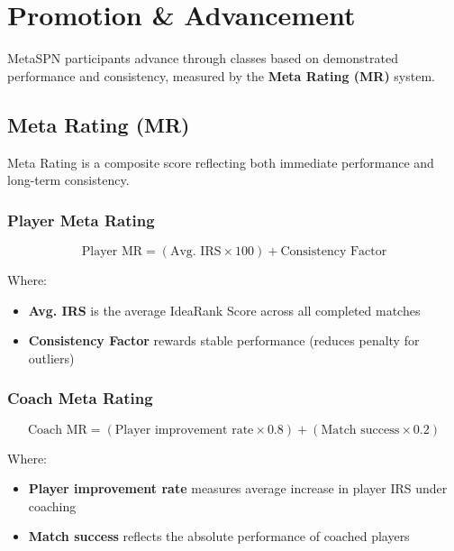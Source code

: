 \chapter{Promotion \& Advancement}
\label{ch:advancement}

MetaSPN participants advance through classes based on demonstrated performance and consistency, measured by the \textbf{Meta Rating (MR)} system.

\section{Meta Rating (MR)}

Meta Rating is a composite score reflecting both immediate performance and long-term consistency.

\subsection{Player Meta Rating}

\begin{equation}
\text{Player MR} = (\text{Avg. IRS} \times 100) + \text{Consistency Factor}
\end{equation}

Where:
\begin{itemize}[leftmargin=*]
  \item \textbf{Avg. IRS} is the average IdeaRank Score across all completed matches
  \item \textbf{Consistency Factor} rewards stable performance (reduces penalty for outliers)
\end{itemize}

\subsection{Coach Meta Rating}

\begin{equation}
\text{Coach MR} = (\text{Player improvement rate} \times 0.8) + (\text{Match success} \times 0.2)
\end{equation}

Where:
\begin{itemize}[leftmargin=*]
  \item \textbf{Player improvement rate} measures average increase in player IRS under coaching
  \item \textbf{Match success} reflects the absolute performance of coached players
\end{itemize}

